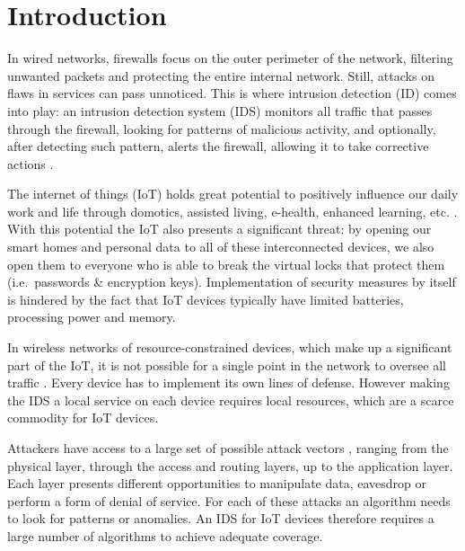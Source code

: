 \documentclass[3p,times,procedia]{elsarticle}
\begin{document}
\vspace*{-10pt}

\section{Introduction}



In wired networks, firewalls focus on the outer perimeter of the network,
filtering unwanted packets and protecting the entire internal network. Still,
attacks on flaws in services can pass unnoticed. This is where intrusion
detection (ID) comes into play: an intrusion detection system (IDS) monitors
all traffic that passes through the firewall, looking for patterns of malicious
activity, and optionally, after detecting such pattern, alerts the firewall,
allowing it to take corrective actions \cite{denning1987intrusion}.


The internet of things (IoT) holds great potential to positively influence our
daily work and life through domotics, assisted living, e-health, enhanced
learning, etc. \cite{atzori2010internet}. With this potential the IoT also
presents a significant threat: by opening our smart homes and personal data to
all of these interconnected devices, we also open them to everyone who is able
to break the virtual locks that protect them (i.e.\ passwords \& encryption
keys). Implementation of security measures by itself is hindered by the fact
that IoT devices typically have limited batteries, processing power and memory.


In wireless networks of resource-constrained devices, which make up a
significant part of the IoT, it is not possible for a single point in the
network to oversee all traffic \cite{mishra2004intrusion}. Every device has to
implement its own lines of defense. However making the IDS a local service on
each device requires local resources, which are a scarce commodity for IoT
devices.

Attackers have access to a large set of possible attack vectors
\cite{aschenbruck2012security}, ranging from the physical layer, through the
access and routing layers, up to the application layer. Each layer presents
different opportunities to manipulate data, eavesdrop or perform a form of
denial of service. For each of these attacks an algorithm needs to look for
patterns or anomalies. An IDS for IoT devices therefore requires a large number
of algorithms to achieve adequate coverage.
\end{document}
